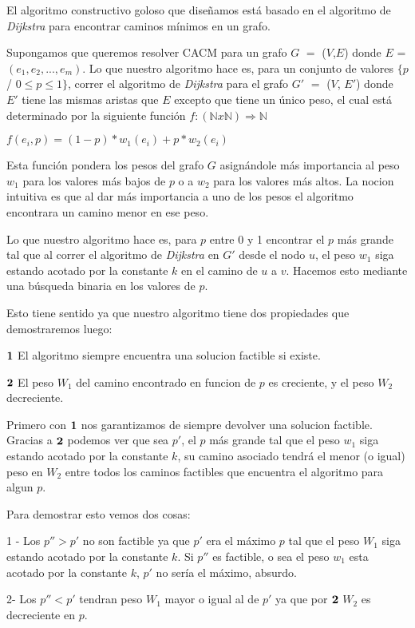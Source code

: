 El algoritmo constructivo goloso que diseñamos está basado en el algoritmo de \emph{Dijkstra} para encontrar caminos mínimos en un grafo. 

Supongamos que queremos resolver CACM para un grafo $G$ $=$ ($V$,$E$) donde $E$ = $(e_1, e_2, ..., e_m)$. Lo que nuestro algoritmo hace es, para un conjunto de valores $\{p$ / $0 \leq p \leq 1\}$, correr el algoritmo de \emph{Dijkstra} para el grafo $G'$ $=$ ($V$, $E'$) donde $E'$ tiene las mismas aristas que $E$ excepto que tiene un único peso, el cual está determinado por la siguiente función $f: (\mathbb{N} x \mathbb{N}) \Rightarrow \mathbb{N}$

$f(e_i,p) = (1-p)*w_1(e_i) + p*w_2(e_i)$

Esta función pondera los pesos del grafo $G$ asignándole más importancia al peso $w_1$ para los valores más bajos de $p$ o a $w_2$ para los valores más altos. La nocion intuitiva es que al dar m\'as importancia a uno de los pesos el algoritmo encontrara un camino menor en ese peso.

Lo que nuestro algoritmo hace es, para $p$ entre 0 y 1 encontrar el $p$ más grande tal que al correr el algoritmo de \emph{Dijkstra} en $G'$ desde el nodo $u$, el peso $w_1$ siga estando acotado por la constante $k$ en el camino de $u$ a $v$. Hacemos esto mediante una búsqueda binaria en los valores de $p$.

Esto tiene sentido ya que nuestro algoritmo tiene dos propiedades que demostraremos luego:

$\bold{1}$ El algoritmo siempre encuentra una solucion factible si existe.

$\bold{2}$ El peso $W_1$ del camino encontrado en funcion de $p$ es creciente, y el peso $W_2$ decreciente.

Primero con $\bold{1}$ nos garantizamos de siempre devolver una solucion factible.
Gracias a $\bold{2}$ podemos ver que sea $p'$, el $p$ más grande tal que el peso $w_1$ siga estando acotado por la constante $k$, su camino asociado tendrá el menor (o igual) peso en $W_2$ entre todos los caminos factibles que encuentra el algoritmo para algun $p$.

Para demostrar esto vemos dos cosas:

1 - Los $p'' > p'$ no son factible ya que $p'$ era el m\'aximo $p$  tal que el peso $W_1$ siga estando acotado por la constante $k$. Si $p''$ es factible, o sea el peso $w_1$ esta acotado por la constante $k$, $p'$ no ser\'ia el m\'aximo, absurdo.

2- Los $p'' < p'$ tendran peso $W_1$ mayor o igual al de $p'$ ya que por $\bold{2}$ $W_2$ es decreciente en $p$.


